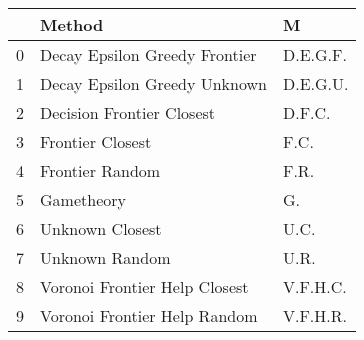 \begin{tabular}{lll}
\toprule
{} &                         Method &         M \\
\midrule
0 &  Decay Epsilon Greedy Frontier &  D.E.G.F. \\
1 &   Decay Epsilon Greedy Unknown &  D.E.G.U. \\
2 &      Decision Frontier Closest &    D.F.C. \\
3 &               Frontier Closest &      F.C. \\
4 &                Frontier Random &      F.R. \\
5 &                     Gametheory &        G. \\
6 &                Unknown Closest &      U.C. \\
7 &                 Unknown Random &      U.R. \\
8 &  Voronoi Frontier Help Closest &  V.F.H.C. \\
9 &   Voronoi Frontier Help Random &  V.F.H.R. \\
\bottomrule
\end{tabular}
